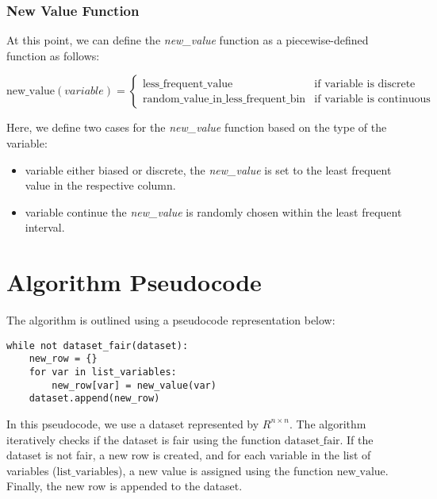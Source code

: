 \documentclass{article}
\begin{document}
\subsubsection{New Value Function}
At this point, we can define the \textit{new\_value} function as a piecewise-defined function as follows:

\[
\text{new\_value}(variable) = 
\begin{cases} 
      \text{less\_frequent\_value} & \text{if } \text{variable} \text{ is discrete} \\
      \text{random\_value\_in\_less\_frequent\_bin} & \text{if } \text{variable} \text{ is  continuous}
\end{cases}
\]

Here, we define two cases for the \textit{new\_value} function based on the type of the variable:
\begin{itemize}
    \item variable either biased or discrete, the \textit{new\_value} is set to the least frequent value in the respective column.
    \item variable continue the \textit{new\_value} is randomly chosen within the least frequent interval.
\end{itemize}

\section{Algorithm Pseudocode}

The algorithm is outlined using a pseudocode representation below:

\begin{verbatim}
while not dataset_fair(dataset):
    new_row = {}
    for var in list_variables:
        new_row[var] = new_value(var)
    dataset.append(new_row)
\end{verbatim}

In this pseudocode, we use a dataset represented by \( R^{n \times n} \). The algorithm iteratively checks if the dataset is fair using the function \( \text{dataset\_fair} \). If the dataset is not fair, a new row is created, and for each variable in the list of variables (\( \text{list\_variables} \)), a new value is assigned using the function \( \text{new\_value} \). Finally, the new row is appended to the dataset.
\end{document}
